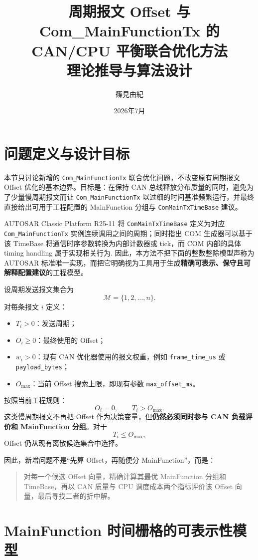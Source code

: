 \documentclass[11pt,a4paper,fontset=none]{ctexart}
\title{\bfseries 周期报文 Offset 与 Com\_MainFunctionTx 的\\CAN/CPU 平衡联合优化方法\\\large 理论推导与算法设计}
\author{篠見由紀}
\date{2026年7月}
\begin{document}
\maketitle
\tableofcontents
\newpage

\section{问题定义与设计目标}

本节只讨论新增的 \texttt{Com\_MainFunctionTx} 联合优化问题，不改变原有周期报文 Offset 优化的基本边界。目标是：在保持 CAN 总线释放分布质量的同时，避免为了少量慢周期报文而让 \texttt{Com\_MainFunctionTx} 以过细的时间基准频繁运行，并最终直接给出可用于工程配置的 MainFunction 分组与 \texttt{ComMainTxTimeBase} 建议。

AUTOSAR Classic Platform R25-11 将 \texttt{ComMainTxTimeBase} 定义为对应 \texttt{Com\_MainFunctionTx} 实例连续调用之间的周期；同时指出 COM 生成器可以基于该 TimeBase 将通信时序参数转换为内部计数器或 tick，而 COM 内部的具体 timing handling 属于实现相关行为\cite{autosar_com}. 因此，本方法不把下面的整数整除模型声称为 AUTOSAR 标准唯一实现，而把它明确视为工具用于生成\textbf{精确可表示、保守且可解释配置建议}的工程模型。

设周期发送报文集合为
\[
\mathcal{M}=\{1,2,\ldots,n\}.
\]
对每条报文 $i$ 定义：
\begin{itemize}
  \item $T_i>0$：发送周期；
  \item $O_i\ge 0$：最终使用的 Offset；
  \item $w_i>0$：现有 CAN 优化器使用的报文权重，例如 \texttt{frame\_time\_us} 或 \texttt{payload\_bytes}；
  \item $O_{\max}$：当前 Offset 搜索上限，即现有参数 \texttt{max\_offset\_ms}。
\end{itemize}

按照当前工程规则：
\[
O_i=0,\qquad T_i>O_{\max}.
\tag{1}
\]
这类慢周期报文不再把 Offset 作为决策变量，但\textbf{仍然必须同时参与 CAN 负载评价和 MainFunction 分组}。对于
\[
T_i\le O_{\max},
\]
Offset 仍从现有离散候选集合中选择。

因此，新增问题不是“先算 Offset，再随便分 MainFunction”，而是：
\begin{quote}
对每一个候选 Offset 向量，精确计算其最优 MainFunction 分组和 TimeBase，再以 CAN 质量与 CPU 调度成本两个指标评价该 Offset 向量，最后寻找二者的折中解。
\end{quote}

\section{MainFunction 时间栅格的可表示性模型}
\end{document}
